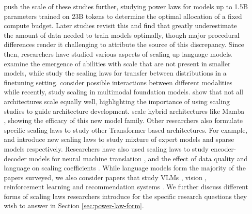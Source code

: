 \cite{kaplan2020scaling} push the scale of these studies further, studying power laws for models up to 1.5B parameters trained on 23B tokens to determine the optimal allocation of a fixed compute budget. Later studies \citep{hoffmann2022training,hu2024minicpm} revisit this and find that \cite{kaplan2020scaling} greatly underestimate the amount of data needed to train models optimally, though major procedural differences render it challenging to attribute the source of this discrepancy. Since then, researchers have studied various aspects of scaling up language models. \cite{wei2022emergent} examine the emergence of abilities with scale that are not present in smaller models, while \cite{hernandez2021scaling} study the scaling laws for transfer between distributions in a finetuning setting. \cite{henighan2020scaling} consider possible interactions between different modalities while recently, \cite{aghajanyan2023scaling} study scaling in multimodal foundation models. \cite{tay2022scaling} show that not all architectures scale equally well, highlighting the importance of using scaling studies to guide architecture development. \cite{poli2024mechanistic} scale hybrid architectures like Mamba \citep{gu2023mamba}, showing the efficacy of this new model family. Other researchers also formulate specific scaling laws to study other Transformer based architectures. For example, \cite{clark2022unified} and \cite{frantar2023scaling} introduce new scaling laws to study mixture of expert models \citep{fedus2022switch,shazeer2017outrageously} and sparse models \citep{zhu2017prune} respectively. Researchers have also used scaling laws to study encoder-decoder models for neural machine translation \citep{ghorbani2021scaling,gordon2021data}, and the effect of data quality and language on scaling coefficients \citep{bansal2022data,zhang2022examining}. While language models form the majority of the papers surveyed, we also consider papers that study VLMs \citep{cherti2023reproducible,henighan2020scaling}, vision \citep{alabdulmohsin2022revisiting,zhai2022scaling}, reinforcement learning \citep{hilton2023scaling,jones2021scaling, gao2023scaling} and recommendation systems \citep{ardalani2022understanding}. We further discuss different forms of scaling laws researchers introduce for the specific research questions they wish to answer in Section \ref{sec:power-law-form}. 

